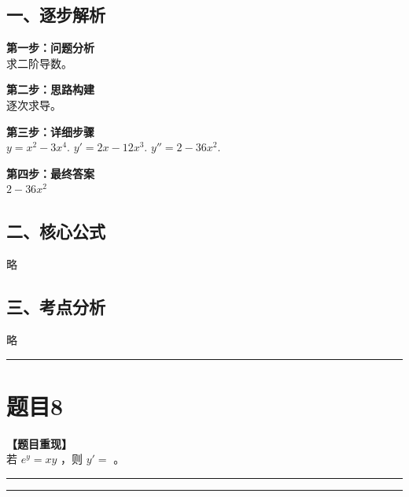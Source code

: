 \documentclass[12pt, a4paper]{ctexart}
\newcommand{\TopSeparator}{
    \par\noindent\rule{\textwidth}{1.5pt}\vspace{0.5em} %
}
\newcommand{\AnalysisSeparator}{
    \par\noindent\rule{\textwidth}{0.5pt}\vspace{0.2em}\hrule\vspace{0.5em} %
}
\newenvironment{RedAnalysis}{
    \par
    \color{red} %
}{
    \par
    \color{black} %
}
\begin{document}
\begin{RedAnalysis}

\subsection*{一、逐步解析}

\textbf{第一步：问题分析} \\
求二阶导数。

\textbf{第二步：思路构建} \\
逐次求导。

\textbf{第三步：详细步骤} \\
$y = x^2 - 3x^4$.
$y' = 2x - 12x^3$.
$y'' = 2 - 36x^2$.

\textbf{第四步：最终答案} \\
$2 - 36x^2$

\subsection*{二、核心公式}
略

\subsection*{三、考点分析}
略

\end{RedAnalysis}

\vspace{2em}

\TopSeparator
\section*{题目8}

\textbf{【题目重现】} \\
若 $ e^{y} = xy $ ，则 $ y'= $ \underline{\hspace{2cm}}。

\AnalysisSeparator
\end{document}
